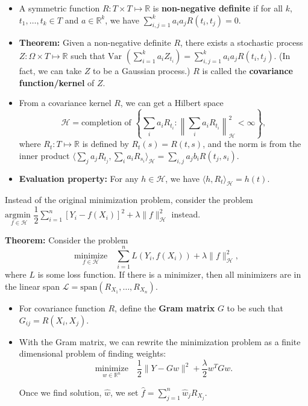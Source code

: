 \documentclass[twoside]{article}
\newcommand\dis{\displaystyle}
\newcommand\bbR{\mathbb{R}}
\newcommand\calH{\mathcal{H}}
\newcommand\lmb{\lambda}
\newcommand\Om{\Omega}
\newcommand\var{\text{Var }}
\begin{document}
\begin{itemize}
\item A symmetric function $R: T \times T \mapsto \bbR$ is \textbf{non-negative definite} if for all $k$, $t_1, \dots, t_k \in T$ and $a \in \bbR^k$, we have $\dis\sum_{i,j = 1}^k a_i a_j R(t_i, t_j) = 0$.

\item \textbf{Theorem:} Given a non-negative definite $R$, there exists a stochastic process $Z: \Om \times T \mapsto \bbR$ such that $\var \left(\dis\sum_{i=1}^k a_i Z_{t_i} \right) = \dis\sum_{i,j = 1}^k a_i a_j R(t_i, t_j)$. (In fact, we can take $Z$ to be a Gaussian process.) $R$ is called the \textbf{covariance function/kernel} of $Z$.

\item From a covariance kernel $R$, we can get a Hilbert space
\[ \calH = \text{completion of } \left\{ \sum_i a_i R_{t_i}: \left\| \sum_i a_i R_{t_i} \right\|_\calH^2 < \infty \right\}, \]
where $R_t: T \mapsto \bbR$ is defined by $R_t(s) = R(t,s)$, and the norm is from the inner product $\langle \sum_j a_j R_{t_j}, \sum_i a_i R_{s_i} \rangle_\calH = \sum_{i,j} a_j b_i R(t_j, s_i)$.

\item \textbf{Evaluation property:} For any $h \in \calH$, we have $\langle h, R_t \rangle_\calH = h(t)$.
\end{itemize}

Instead of the original minimization problem, consider the problem $\underset{f \in \calH}{\text{argmin }} \dfrac{1}{2}\dis\sum_{i=1}^n \left[ Y_i - f(X_i) \right]^2 + \lmb \| f \|_\calH^2$ instead.

\textbf{Theorem:} Consider the problem
\begin{equation*}
\underset{f \in \calH}{\text{minimize}} \quad \sum_{i=1}^n L \left( Y_i, f(X_i) \right) + \lmb \| f \|_\calH^2,
\end{equation*}
where $L$ is some loss function. If there is a minimizer, then all minimizers are in the linear span $\mathcal{L} = \text{span}(R_{X_1}, \dots, R_{X_n})$.

\begin{itemize}
\item For covariance function $R$, define the \textbf{Gram matrix} $G$ to be such that $G_{ij} = R(X_i, X_j)$.
\item With the Gram matrix, we can rewrite the minimization problem as a finite dimensional problem of finding weights:
\[ \underset{w \in \bbR^n}{\text{minimize}} \quad \frac{1}{2}\| Y - Gw \|^2 + \frac{\lmb}{2} w^T G w. \]

Once we find solution, $\hat{w}$, we set $\hat{f} = \dis\sum_{j=1}^n \hat{w}_j R_{X_j}$.
\end{itemize}
\end{document}
